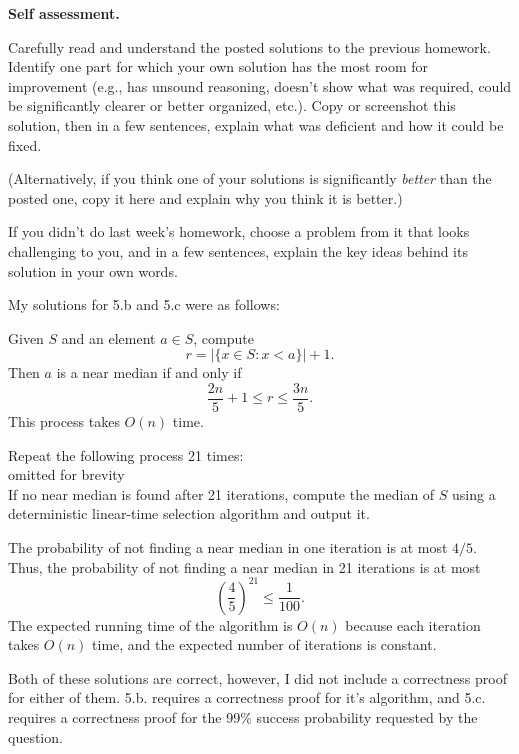 \documentclass[11pt,addpoints,answers]{exam}
\begin{document}
\begin{questions}

  \question[10] \textbf{Self assessment.} \nopagebreak
  
  Carefully read and understand the posted solutions to the previous homework.
  Identify one part for which your own solution has the most room for improvement (e.g., has unsound reasoning, doesn’t show what was required, could be significantly clearer or better organized, etc.).
  Copy or screenshot this solution, then in a few sentences, explain what was deficient and how it could be fixed.

  (Alternatively, if you think one of your solutions is significantly \emph{better} than the posted one, copy it here and explain why you think it is better.)

  If you didn't do last week's homework, choose a problem from it that looks challenging to you, and in a few sentences, explain the key ideas behind its solution in your own words.

  \begin{solution} 
  My solutions for 5.b and 5.c were as follows:

  \begin{solution}
  Given \( S \) and an element \( a \in S \), compute
  \[
  r = |\{ x \in S : x < a \}| + 1.
  \]
  Then \( a \) is a near median if and only if
  \[
  \frac{2n}{5}+1 \le r \le \frac{3n}{5}.
  \]
  This process takes \( O(n) \) time.
  \end{solution}
  \begin{solution}
  Repeat the following process 21 times: \\
  \textlangle omitted for brevity\textrangle \\
  If no near median is found after 21 iterations, compute the median of \( S \) using a deterministic linear-time selection algorithm and output it.

  The probability of not finding a near median in one iteration is at most \( 4/5 \). Thus, the probability of not finding a near median in 21 iterations is at most
  \[
  \left(\frac{4}{5}\right)^{21} \le \frac{1}{100}.
  \]
  The expected running time of the algorithm is \( O(n) \) because each iteration takes \( O(n) \) time, and the expected number of iterations is constant.
  \end{solution}
  
  Both of these solutions are correct, however, I did not include a correctness proof for either of them. 5.b. requires a correctness proof for it's algorithm, and 5.c. requires a correctness proof for the 99\% success probability requested by the question.
  \end{solution}


\end{questions}
\end{document}
